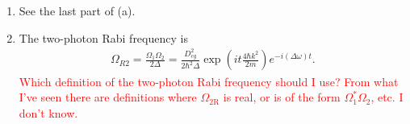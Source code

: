 \documentclass{article}
\theoremstyle{definition}
\newcommand{\f}[2]{\frac{#1}{#2}}
\newcommand{\lp}{\left(}
\newcommand{\rp}{\right)}
\newcommand{\lb}{\left[}
\newcommand{\rb}{\right]}
\begin{document}
\begin{enumerate}
\begin{enumerate}[label=(\alph*)]
		\item See the last part of (a).
		
%		
%		

	\item The two-photon Rabi frequency is
	\begin{align*}
	\Omega_{R2} = \f{\Omega_1\Omega_2}{2\Delta} =  \f{D^2_{eg}}{2\hbar^2\Delta}\exp\lp it \f{4\hbar k^2}{2m} \rp e^{-i(\Delta \omega) t}.
	\end{align*}
	\textcolor{red}{Which definition of the two-photon Rabi frequency should I use? From what I've seen there are definitions where $\Omega_{\text{2R}}$ is real, or is of the form $\Omega_1^* \Omega_2$, etc. I don't know.}
	

\end{enumerate}
\end{enumerate}
\end{document}
